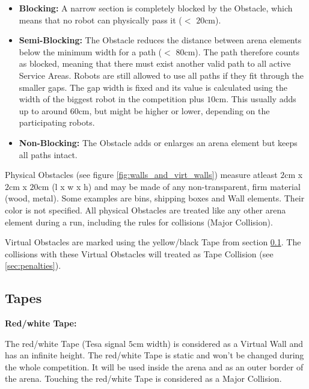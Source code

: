 \begin{itemize}
\item \textbf{Blocking:} 
A narrow section is completely blocked by the Obstacle, which means that no robot can physically pass it ($<$ $20\si{\centi\meter}$).

\item \textbf{Semi-Blocking:} 
The Obstacle reduces the distance between arena elements below the minimum width for a path ($<$ $80\si{\centi\meter}$). The path therefore counts as blocked, meaning that there must exist another valid path to all active Service Areas. Robots are still allowed to use all paths if they fit through the smaller gaps.
The gap width is fixed and its value is calculated using the width of the biggest robot in the competition plus $ 10\si{\centi\meter}$. This usually adds up to around $ 60\si{\centi\meter}$,
but might be higher or lower, depending on the participating robots.

\item \textbf{Non-Blocking:}
The Obstacle adds or enlarges an arena element but keeps all paths intact.
\end{itemize}


Physical Obstacles (see figure \ref{fig:walls_and_virt_walls}) measure atleast $2\si{\centi\meter}$ x $2\si{\centi\meter}$ x $20\si{\centi\meter}$ (l x w x h) and may be made of any non-transparent, firm material (wood, metal). Some examples are bins, shipping boxes and Wall elements. Their color is not specified.
All physical Obstacles are treated like any other arena element during a run, including the rules for collisions (Major Collision).

Virtual Obstacles are marked using the yellow/black Tape from section \ref{subsec:Tapes}. The collisions with these Virtual Obstacles will treated as Tape Collision (see \ref{sec:penalties}).


\subsection{Tapes}
\label{subsec:Tapes}

\textbf{Red/white Tape:}

The red/white Tape (Tesa signal $5\si{\centi\meter}$ width) is considered as a Virtual Wall and has an infinite height. The red/white Tape is static and won't be changed during the whole competition. It will be used inside the arena and as an outer border of the arena.  Touching the red/white Tape is considered as a Major Collision.

